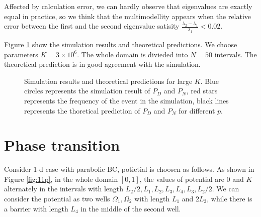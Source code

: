 \documentclass[12pt,a4paper]{article}
\begin{document}
Affected by calculation error, we can hardly observe that eigenvalues are exactly equal in practice, so we think that the multimodellity appears when the relative error between the first and the second eigenvalue satisity $\frac{\lambda_2 - \lambda_1}{\lambda_1} < 0.02$.


Figure \ref{fig:10} show the simulation results and theoretical predictions. We choose parameters $K = 3 \times 10^6$. The whole domain is divieded into $N = 50$ intervals. The theoretical prediction is in good agreement with the simulation.
\begin{figure}[h]
\centering
{}
\caption{Simulation results and theoretical predictions for large $K$. Blue circles represents the simulation result of $P_D$ and $P_N$, red stars represents the frequency of the event in the simulation, black lines represents the thoretical prediction of $P_D$ and $P_N$ for different $p$.}
\label{fig:10}
\end{figure}

\section{Phase transition}\label{sec:phase}

Consider 1-d case with parabolic BC, potietial is choosen as follows. As shown in Figure \ref{fig:11p}, in the whole domain $[0,1]$, the values of potential are $0$ and $K$ alternately in the intervals with length $L_2/2, L_1, L_2, L_3, L_4, L_3, L_2/2$. We can consider the potential as two wells $\Omega_1, \Omega_2$ with length $L_1$ and $2 L_3$, while there is a barrier with length $L_4$ in the middle of the second well.
\end{document}
